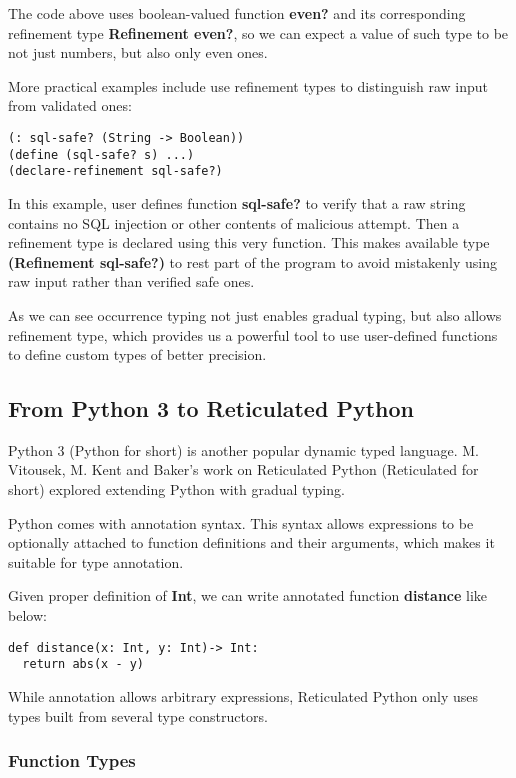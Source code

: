The code above uses boolean-valued function \textbf{even?}
and its corresponding refinement type \textbf{Refinement even?},
so we can expect a value of such type to be not just numbers, but also only even ones.

More practical examples include use refinement types to distinguish raw input
from validated ones:

\begin{verbatim}
(: sql-safe? (String -> Boolean))
(define (sql-safe? s) ...)
(declare-refinement sql-safe?)
\end{verbatim}

In this example, user defines function \textbf{sql-safe?} to verify
that a raw string contains no SQL injection or other contents of malicious attempt.
Then a refinement type is declared using this very function.
This makes available type \textbf{(Refinement sql-safe?)} to rest part of the program
to avoid mistakenly using raw input rather than verified safe ones.

As we can see occurrence typing not just enables
gradual typing, but also allows refinement type,
which provides us a powerful tool to use user-defined functions
to define custom types of better precision.

\subsection{From Python 3 to Reticulated Python}

Python 3 (Python for short) is another popular dynamic typed language.
M. Vitousek, M. Kent and Baker's work on Reticulated Python (Reticulated for short)
explored extending Python with gradual typing.

Python comes with annotation syntax.
This syntax allows expressions to be optionally attached to
function definitions and their arguments,
which makes it suitable for type annotation.

Given proper definition of \textbf{Int}, we can write annotated
function \textbf{distance} like below:

\begin{verbatim}
def distance(x: Int, y: Int)-> Int:
  return abs(x - y)
\end{verbatim}

While annotation allows arbitrary expressions, Reticulated Python
only uses types built from several type constructors.

\subsubsection{Function Types}

